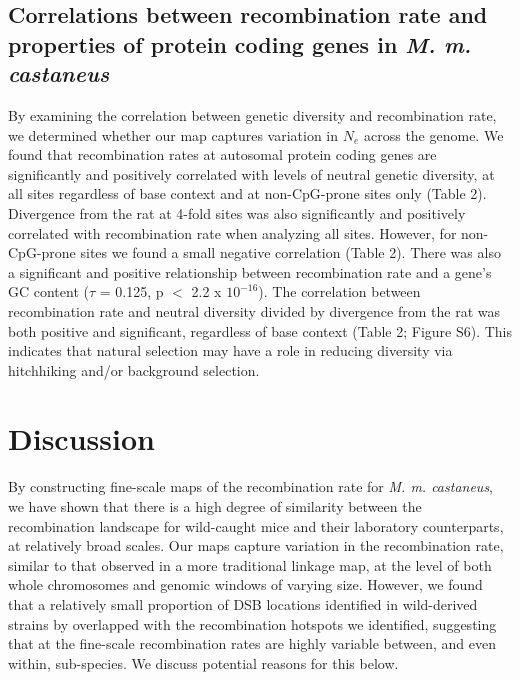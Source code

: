 \subsection{Correlations between recombination rate and properties of protein coding genes in \emph{M. m. castaneus}}

	By examining the correlation between genetic diversity and recombination rate, we determined whether our map captures variation in $N_e$ across the genome. We found that recombination rates at autosomal protein coding genes are significantly and positively correlated with levels of neutral genetic diversity, at all sites regardless of base context and at non-CpG-prone sites only (Table 2). Divergence from the rat at 4-fold sites was also significantly and positively correlated with recombination rate when analyzing all sites. However, for non-CpG-prone sites we found a small negative correlation (Table 2). There was also a significant and positive relationship between recombination rate and a gene’s GC content ($\tau$ = 0.125, p $<$ 2.2 x $10^{-16}$). The correlation between recombination rate and neutral diversity divided by divergence from the rat was both positive and significant, regardless of base context (Table 2; Figure S6). This indicates that natural selection may have a role in reducing diversity via hitchhiking and/or background selection.

\linespread{1}

\linespread{2}

\section{Discussion}
 
        	By constructing fine-scale maps of the recombination rate for \textit{M. m. castaneus}, we have shown that there is a high degree of similarity between the recombination landscape for wild-caught mice and their laboratory counterparts, at relatively broad scales. Our maps capture variation in the recombination rate, similar to that observed in a more traditional linkage map, at the level of both whole chromosomes and genomic windows of varying size. However, we found that a relatively small proportion of DSB locations identified in wild-derived strains by \cite{RN249} overlapped with the recombination hotspots we identified, suggesting that at the fine-scale recombination rates are highly variable between, and even within, sub-species. We discuss potential reasons for this below.
 
